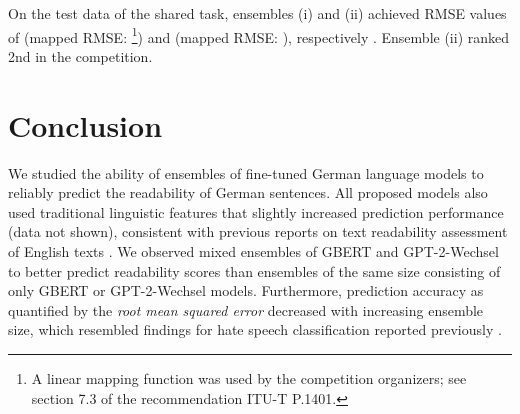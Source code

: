 \documentclass[11pt,a4paper]{article}
\begin{document}
On the test data of the shared task, ensembles (i) and (ii) achieved RMSE values of  (mapped RMSE: \footnote{A linear mapping function was used by the competition organizers; see section 7.3 of the recommendation ITU-T P.1401.}) and  (mapped RMSE: \footnotemark[5]), respectively \cite{Mohtaj2022}.
Ensemble (ii) ranked 2nd in the competition.
 
\section{Conclusion}

We studied the ability of ensembles of fine-tuned German language models to reliably predict the readability of German sentences. 
All proposed models also used traditional linguistic features that slightly increased prediction performance (data not shown), consistent with previous reports on text readability assessment of English texts \cite{Imperial2021,Lee2021}. 
We observed mixed ensembles of GBERT and GPT-2-Wechsel to better predict readability scores than ensembles of the same size consisting of only GBERT or GPT-2-Wechsel models. 
Furthermore, prediction accuracy as quantified by the \emph{root mean squared error} decreased with increasing ensemble size, which resembled findings for hate speech classification reported previously \cite{Risch2020,Bornheim2021}.
 
\end{document}
